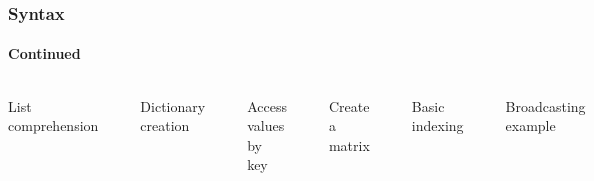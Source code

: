 \documentclass[aspectratio=169]{beamer} %
\begin{document}
  \begin{frame}[fragile]
    \frametitle{Syntax}
    \framesubtitle{Continued}

    \begin{columns}[t]
    List comprehension
    \begin{verbatim}
  squares = [i^2 for i in 1:5]
  squares = [i^2 for i in numbers]
  \end{verbatim}
  
  Dictionary creation
  \begin{verbatim}
  person = Dict(
  "name" => "Alice",
  "age" => 30,
  "city" => "New York")
  \end{verbatim}
  Access values by key
  \begin{verbatim}
  person["name"])
    \end{verbatim}
    
  Create a matrix
\begin{verbatim}
  A = [1 2 3; 4 5 6; 7 8 9]
\end{verbatim}
Basic indexing
\begin{verbatim}
  element = A[2, 3]
  second_row = A[2, :]
  third_column = A[:, 3]
  submatrix = A[1:2, 2:3] 
\end{verbatim}
    Broadcasting example
    \begin{verbatim}
  A = [1 2 3; 4 5 6; 7 8 9]
  B = [2 2 2; 2 2 2; 2 2 2]
  C = A .+ B
  \end{verbatim}
    \end{columns}
    
    \end{frame}
\end{document}
